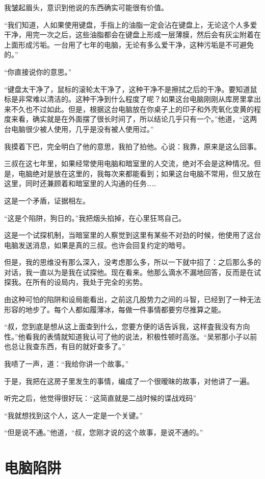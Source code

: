 我皱起眉头，意识到他说的东西确实可能很有价值。

“我们知道，人如果使用键盘，手指上的油脂一定会沾在键盘上，无论这个人多爱干净，用完一次之后，这些油脂都会在键盘上形成一层薄膜，然后会有灰尘附着在上面形成污垢。一台用了七年的电脑，无论有多么爱干净，这种污垢是不可避免的。”

“你直接说你的意思。”

“键盘太干净了，鼠标的滚轮太干净了，这种干净不是擦拭之后的干净。要知道鼠标是非常难以清洁的。这种干净到什么程度了呢？如果这台电脑刚刚从库房里拿出来不久也不过如此。但是，根据这台电脑放在你桌子上的印子和外壳氧化变黄的程度来看，确实就是在外面摆了很长时间了，所以结论几乎只有一个。”他道，“这两台电脑很少被人使用，几乎是没有被人使用过。”

我摸着下巴，完全明白了他的意思，我拍了拍他。心说：我靠，原来是这么回事。

三叔在这七年里，如果经常使用电脑和暗室里的人交流，绝对不会是这种情况。但是，电脑绝对是放在这里的，我每次来都能看到；如果这台电脑不常用，但又放在这里，同时还兼顾着和暗室里的人沟通的任务……

这是一个矛盾，证据相左。

“这是个陷阱，狗日的。”我把烟头掐掉，在心里狂骂自己。

这是一个试探机制，当暗室里的人察觉到这里有某些不对劲的时候，他使用了这台电脑发送消息，如果是真的三叔。也许会回复约定的暗号。

但是，我的思维没有那么深入，没考虑那么多，所以一下就中招了：之后那么多的对话，我一直以为是我在试探他。现在看来。他那么滴水不漏地回答，反而是在试探我。在所有的设局内，我处于完全的劣势。

由这种可怕的陷阱和设局能看出，之前这几股势力之间的斗智，已经到了一种无法形容的地步了。每个人都如履薄冰，每做一件事情都要穷尽推算之能。

“叔，您到底是想从这上面查到什么，您要方便的话告诉我，这样査我没有方向性。”他看我的表情就知道我认可了他的说法，积极性顿时高涨。“吴邪那小子以前也总让我查东西，有目的就好查多了。”

我啧了一声，道：“我给你讲一个故事。”

于是，我把在这房子里发生的事情，编成了一个很暧昧的故事，对他讲了一遍。

听完之后，他觉得很好玩：“这简直就是二战时候的谍战戏码”

“我就想找到这个人，这人一定是一个关键。”

“但是说不通。”他道，“叔，您刚才说的这个故事，是说不通的。”

\chapter{电脑陷阱}

